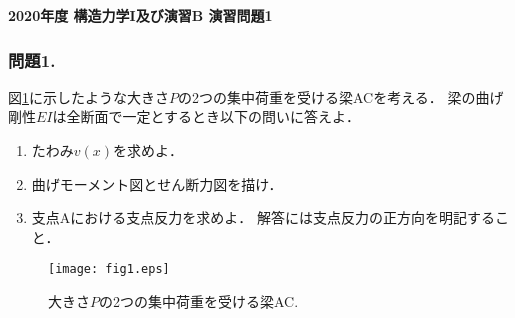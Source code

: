 \documentclass[10pt,a4j]{jarticle}
\newlength{\minitwocolumn}
\begin{document}
\newcommand{\fat}[1]{\mbox{\boldmath $#1$}}
\newcommand{\D}{\partial}
\newcommand{\w}{\omega}
\newcommand{\ga}{\alpha}
\newcommand{\gb}{\beta}
\newcommand{\gx}{\xi}
\newcommand{\gz}{\zeta}
\newcommand{\vhat}[1]{\hat{\fat{#1}}}
\newcommand{\spc}{\vspace{0.7\baselineskip}}
\newcommand{\halfspc}{\vspace{0.3\baselineskip}}

\pagestyle{empty}
\newcommand{\twofig}[2]
 {
   \begin{figure}[h]
     \begin{minipage}[t]{\minitwocolumn}
         \begin{center}   #1
         \end{center}
     \end{minipage}
         \hspace{\columnsep}
     \begin{minipage}[t]{\minitwocolumn}
         \begin{center} #2
         \end{center}
     \end{minipage}
   \end{figure}
 }
\begin{center}
{\Large \bf 2020年度 構造力学I及び演習B 演習問題1} \\
\end{center}
\subsubsection*{問題1. }
図\ref{fig:fig1}に示したような大きさ$P$の2つの集中荷重を受ける梁ACを考える．
梁の曲げ剛性$EI$は全断面で一定とするとき以下の問いに答えよ．
\begin{enumerate}
\item
	たわみ$v(x)$を求めよ．
\item
	曲げモーメント図とせん断力図を描け．
\item
	支点Aにおける支点反力を求めよ．
	解答には支点反力の正方向を明記すること．
\end{enumerate}
\begin{figure}[h]
	\begin{center}
	\texttt{[image: fig1.eps]} 
	\end{center}
	\vspace{-5mm}
	\caption{大きさ$P$の2つの集中荷重を受ける梁AC.}
	\label{fig:fig1}
\end{figure}
\end{document}
